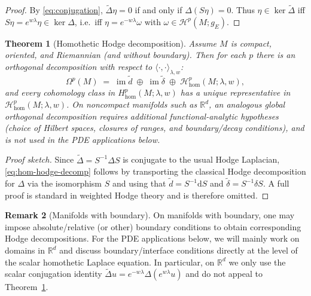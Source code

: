 \documentclass[preprint,12pt]{elsarticle}
\theoremstyle{plain}
\newtheorem{theorem}{Theorem}[section]
\theoremstyle{definition}
\newtheorem{remark}[theorem]{Remark}
\theoremstyle{note}
\newcommand{\R}{\mathbb{R}}
\newcommand{\dd}{\mathrm{d}}
\newcommand{\wtd}{\tilde d}
\newcommand{\wtdel}{\tilde\delta}
\newcommand{\wtD}{\tilde\Delta}
\begin{document}
\begin{proof}
By \eqref{eq:conjugation}, $\wtD\eta=0$ if and only if $\Delta(S\eta)=0$.
Thus $\eta\in\ker\wtD$ iff $S\eta=e^{w\lambda}\eta\in\ker\Delta$, i.e.\ iff $\eta=e^{-w\lambda}\omega$ with $\omega\in\mathcal{H}^p(M;g_E)$.
\end{proof}

\begin{theorem}[Homothetic Hodge decomposition]\label{thm:hom-hodge}
Assume $M$ is compact, oriented, and Riemannian (and without boundary).
Then for each $p$ there is an orthogonal decomposition with respect to $\langle\cdot,\cdot\rangle_{\lambda,w}$:
\begin{equation}\label{eq:hom-hodge-decomp}
\boxed{
\Omega^p(M) \;=\; \operatorname{im}\wtd \;\oplus\; \operatorname{im}\wtdel \;\oplus\;
\mathcal{H}^p_{\mathrm{hom}}(M;\lambda,w),}
\end{equation}
and every cohomology class in $H^p_{\mathrm{hom}}(M;\lambda,w)$ has a unique representative in
$\mathcal{H}^p_{\mathrm{hom}}(M;\lambda,w)$.
On noncompact manifolds such as $\R^d$, an analogous global orthogonal decomposition requires additional functional-analytic hypotheses (choice of Hilbert spaces, closures of ranges, and boundary/decay conditions), and is not used in the PDE applications below.
\end{theorem}

\begin{proof}[Proof sketch]
Since $\wtD=S^{-1}\Delta S$ is conjugate to the usual Hodge Laplacian, \eqref{eq:hom-hodge-decomp} follows by transporting the classical Hodge decomposition for $\Delta$ via the isomorphism $S$ and using that $\wtd=S^{-1}\dd S$ and $\wtdel=S^{-1}\delta S$.
A full proof is standard in weighted Hodge theory and is therefore omitted.
\end{proof}

\begin{remark}[Manifolds with boundary]\label{rem:boundary}
On manifolds with boundary, one may impose absolute/relative (or other) boundary conditions to obtain corresponding Hodge decompositions.
For the PDE applications below, we will mainly work on domains in $\R^d$ and discuss boundary/interface conditions directly at the level of the scalar homothetic Laplace equation.
In particular, on $\R^d$ we only use the scalar conjugation identity $\tilde\Delta u = e^{-w\lambda}\Delta(e^{w\lambda}u)$ and do not appeal to Theorem~\ref{thm:hom-hodge}.
\end{remark}
\end{document}
